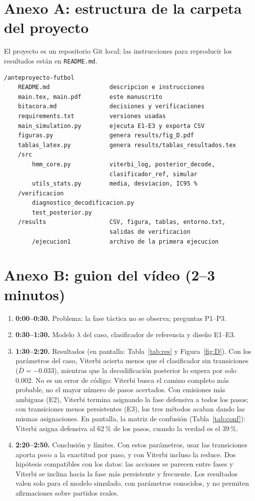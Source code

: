 \documentclass[11pt,a4paper]{article}
\begin{document}
\section*{Anexo A: estructura de la carpeta del proyecto}
El proyecto es un repositorio Git local; las instrucciones para reproducir los
resultados están en \texttt{README.md}.
\begin{verbatim}
/anteproyecto-futbol
    README.md                 descripcion e instrucciones
    main.tex, main.pdf        este manuscrito
    bitacora.md               decisiones y verificaciones
    requirements.txt          versiones usadas
    main_simulation.py        ejecuta E1-E3 y exporta CSV
    figuras.py                genera results/fig_D.pdf
    tablas_latex.py           genera results/tablas_resultados.tex
    /src
        hmm_core.py           viterbi_log, posterior_decode,
                              clasificador_ref, simular
        utils_stats.py        media, desviacion, IC95 %
    /verificacion
        diagnostico_decodificacion.py
        test_posterior.py
    /results                  CSV, figura, tablas, entorno.txt,
                              salidas de verificacion
        /ejecucion1           archivo de la primera ejecucion
\end{verbatim}

\section*{Anexo B: guion del vídeo (2--3 minutos)}
\begin{enumerate}
\item \textbf{0:00--0:30.} Problema: la fase táctica no se observa; preguntas P1--P3.
\item \textbf{0:30--1:30.} Modelo $\lambda$ del caso, clasificador de referencia y diseño E1--E3.
\item \textbf{1:30--2:20.} Resultados (en pantalla: Tabla~\ref{tab:res} y
Figura~\ref{fig:D}). Con los parámetros del caso, Viterbi acierta menos que el
clasificador sin transiciones ($\bar D=-0.033$), mientras que la decodificación
posterior lo supera por solo $0.002$. No es un error de código: Viterbi busca
el camino completo más probable, no el mayor número de pasos acertados. Con
emisiones más ambiguas (E2), Viterbi termina asignando la fase defensiva a
todos los pasos; con transiciones menos persistentes (E3), los tres métodos
acaban dando las mismas asignaciones. En pantalla, la matriz de confusión
(Tabla~\ref{tab:conf}): Viterbi asigna defensiva al 62\,\% de los pasos,
cuando la verdad es el 39\,\%.
\item \textbf{2:20--2:50.} Conclusión y límites. Con estos parámetros, usar
las transiciones aporta poco a la exactitud por paso, y con Viterbi incluso la
reduce. Dos hipótesis compatibles con los datos: las acciones se parecen entre
fases y Viterbi se inclina hacia la fase más persistente y frecuente. Los
resultados valen solo para el modelo simulado, con parámetros conocidos, y no
permiten afirmaciones sobre partidos reales.
\end{enumerate}
\end{document}
